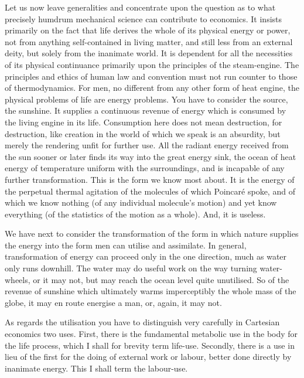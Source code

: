 \documentclass[10.5pt,twoside]{book}
\newcommand{\origpage}[1]{\clearpage\setcounter{page}{#1}}
\begin{document}
\origpage{9}

Let us now leave generalities and concentrate upon the question as to what
precisely humdrum mechanical science can contribute to economics. It insists
primarily on the fact that life derives the whole of its physical energy or
power, not from anything self-contained in living matter, and still less from
an external deity, but solely from the inanimate world. It is dependent for
all the necessities of its physical continuance primarily upon the principles
of the steam-engine. The principles and ethics of human law and convention
must not run counter to those of thermodynamics. For men, no different from
any other form of heat engine, the physical problems of life are energy
problems. You have to consider the source, the sunshine. It supplies a
continuous revenue of energy which is consumed by the living engine in its
life. Consumption here does not mean destruction, for destruction, like
creation in the world of which we speak is an absurdity, but merely the
rendering unfit for further use. All the radiant energy received from the sun
sooner or later finds its way into the great energy sink, the ocean of heat
energy of temperature uniform with the surroundings, and is incapable of any
further transformation. This is the form we know most about. It is the energy
of the perpetual thermal agitation of the molecules of which Poincar\'e spoke,
and of which we know nothing (of any individual molecule's motion) and yet
know everything (of the statistics of the motion as a whole). And, it is
useless.

We have next to consider the transformation of the form in which nature
supplies the energy into the form men can utilise and assimilate. In general,
transformation of energy can proceed only in the one direction, much as water
only runs downhill. The water may do useful work on the way turning
water-wheels, or it may not, but may reach the ocean level quite unutilised.
So of the revenue of sunshine which ultimately warms imperceptibly the whole
mass of the globe, it may en route energise a man, or, again, it may not.

As regards the utilisation you have to distinguish very carefully in Cartesian
economics two uses. First, there is the fundamental metabolic use in the body
for the life process, which I shall for brevity term life-use. Secondly, there
is a use in lieu of the first for the doing of external work or labour, better
done directly by inanimate energy. This I shall term the labour-use.
\end{document}
